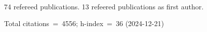 74 refereed publications. 13 refeered publications as first author.

Total citations~=~4556; h-index~=~36 (2024-12-21)